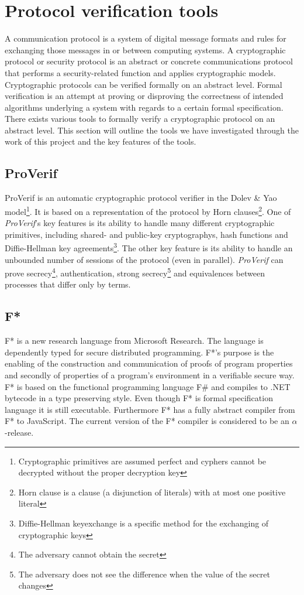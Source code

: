 \documentclass[twosided]{report}
\begin{document}
\section{Protocol verification tools}
A communication protocol is a system of digital message formats and rules for exchanging those messages in or between computing systems. A cryptographic protocol or security protocol is an abstract or concrete communications protocol that performs a security-related function and applies cryptographic models. Cryptographic protocols can be verified formally on an abstract level. Formal verification is an attempt at proving or disproving the correctness of intended algorithms underlying a system with regards to a certain formal specification. There exists various tools to formally verify a cryptographic protocol on an abstract level. This section will outline the tools we have investigated through the work of this project and the key features of the tools.

\subsection{ProVerif}
ProVerif is an automatic cryptographic protocol verifier in the Dolev \& Yao model\footnote{Cryptographic primitives are assumed perfect and cyphers cannot be decrypted without the proper decryption key}. It is based on a representation of the protocol by Horn clauses\footnote{Horn clause is a clause (a disjunction of literals) with at most one positive literal}. One of \emph{ProVerif}'s key features is its ability to handle many different cryptographic primitives, including shared- and public-key cryptographys, hash functions and Diffie-Hellman key agreements\footnote{Diffie-Hellman keyexchange is a specific method for the exchanging of cryptographic keys}. The other key feature is its ability to handle an unbounded number of sessions of the protocol (even in parallel). \emph{ProVerif} can prove secrecy\footnote{The adversary cannot obtain the secret}, authentication, strong secrecy\footnote{The adversary does not see the difference when the value of the secret changes} and equivalences between processes that differ only by terms.

\subsection{F*}
\label{sect:techbgfstar}
F* is a new research language from Microsoft Research. The language is dependently typed for secure distributed programming. F*'s purpose is the enabling of the construction and communication of proofs of program properties and secondly of properties of a program's environment in a verifiable secure way. F* is based on the functional programming language F\# and compiles to .NET bytecode in a type preserving style. Even though F* is formal specification language it is still executable. Furthermore F* has a fully abstract compiler from F* to JavaScript. The current version of the F* compiler is considered to be an $\alpha$-release.
\end{document}

